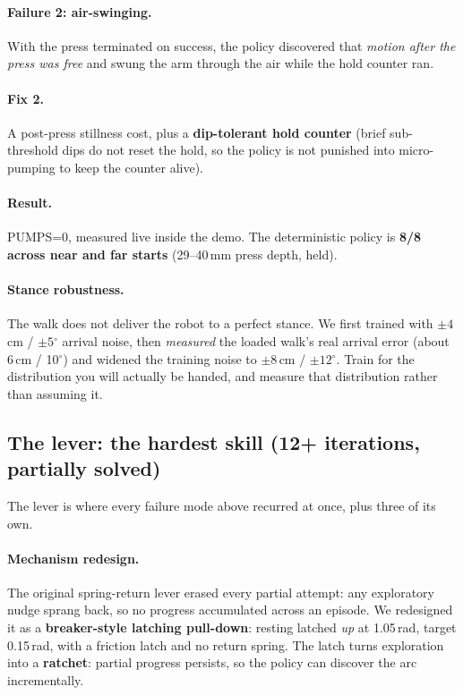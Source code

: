 \documentclass[11pt]{article}
\newcommand{\degs}{$^{\circ}$}
\begin{document}
\paragraph{Failure 2: air-swinging.} With the press terminated on success, the policy discovered that \emph{motion after the press was free} and swung the arm through the air while the hold counter ran.

\paragraph{Fix 2.} A post-press stillness cost, plus a \textbf{dip-tolerant hold counter} (brief sub-threshold dips do not reset the hold, so the policy is not punished into micro-pumping to keep the counter alive).

\paragraph{Result.} PUMPS=0, measured live inside the demo. The deterministic policy is \textbf{8/8 across near and far starts} (29--40\,mm press depth, held).

\paragraph{Stance robustness.} The walk does not deliver the robot to a perfect stance. We first trained with $\pm 4$\,cm / $\pm 5$\degs{} arrival noise, then \emph{measured} the loaded walk's real arrival error (about 6\,cm / 10\degs) and widened the training noise to $\pm 8$\,cm / $\pm 12$\degs. Train for the distribution you will actually be handed, and measure that distribution rather than assuming it.

\subsection{The lever: the hardest skill (12+ iterations, partially solved)}
\label{sec:lever}

The lever is where every failure mode above recurred at once, plus three of its own.

\paragraph{Mechanism redesign.} The original spring-return lever erased every partial attempt: any exploratory nudge sprang back, so no progress accumulated across an episode. We redesigned it as a \textbf{breaker-style latching pull-down}: resting latched \emph{up} at 1.05\,rad, target 0.15\,rad, with a friction latch and no return spring. The latch turns exploration into a \textbf{ratchet}: partial progress persists, so the policy can discover the arc incrementally.
\end{document}
